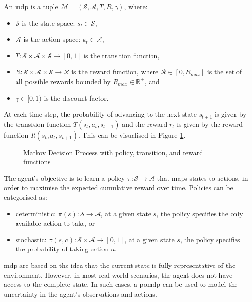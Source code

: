\begin{definition}
    An \acrshort{mdp} is a tuple $\mathcal{M} = \left(\mathcal{S}, \mathcal{A}, T, R, \gamma\right)$, where:
    \begin{itemize}
        \item $\mathcal{S}$ is the state space: $s_t \in \mathcal{S}$,
        \item $\mathcal{A}$ is the action space: $a_t \in \mathcal{A}$,
        \item $T: \mathcal{S} \times \mathcal{A} \times \mathcal{S} \rightarrow [0, 1]$ is the transition function,
        \item $R: \mathcal{S} \times \mathcal{A} \times \mathcal{S} \rightarrow \mathcal{R}$ is the reward function, where $\mathcal{R} \in \left[0, R_{max}\right]$ is the set of all possible rewards bounded by $R_{max} \in \mathbb{R}^+$, and
        \item $\gamma \in [0, 1)$ is the discount factor.
    \end{itemize}
    
\end{definition}

At each time step, the probability of advancing to the next state $s_{t+1}$ is given by the transition function $T(s_t, a_t, s_{t+1})$ and the reward $r_t$ is given by the reward function $R(s_t, a_t, s_{t+1})$. This can be visualised in Figure \ref{fig:mdp}.

\begin{figure}[ht]
    \centering
    
    \caption{Markov Decision Process with policy, transition, and reward functions}
    \label{fig:mdp}
\end{figure}

The agent's objective is to learn a policy $\pi: \mathcal{S} \rightarrow \mathcal{A}$ that maps states to actions, in order to maximise the expected cumulative reward over time. Policies can be categorised as:
\begin{itemize}
    \item deterministic: $\pi(s) : \mathcal{S} \to \mathcal{A}$, at a given state $s$, the policy specifies the only available action to take, or
    \item stochastic: $\pi(s, a) : \mathcal{S} \times \mathcal{A} \to [0, 1]$, at a given state $s$, the policy specifies the probability of taking action $a$.
\end{itemize}

\acrlong{mdp} are based on the idea that the current state is fully representative of the environment. However, in most real world scenarios, the agent does not have access to the complete state. In such cases, a \acrfull{pomdp} can be used to model the uncertainty in the agent's observations and actions.

